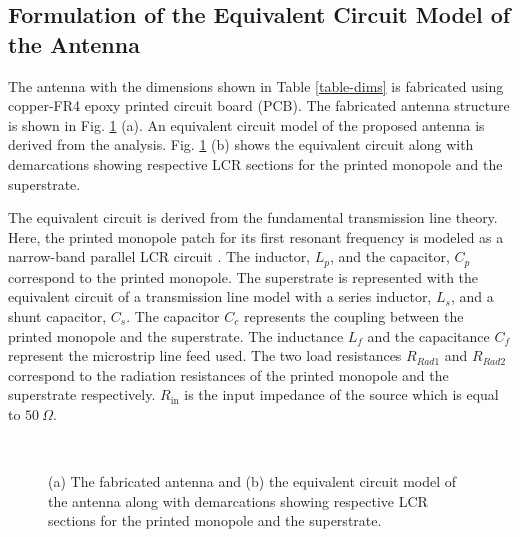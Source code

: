 \subsection{Formulation of the Equivalent Circuit Model of the Antenna}
The antenna with the dimensions shown in Table \ref{table-dims} is fabricated using copper-FR4 epoxy printed circuit board (PCB). The fabricated antenna structure is shown in Fig. \ref{FabEqckt} (a). An equivalent circuit model of the proposed antenna is derived from the analysis. Fig. \ref{FabEqckt} (b) shows the equivalent circuit along with demarcations showing respective LCR sections for the printed monopole and the superstrate.

The equivalent circuit is derived from the fundamental transmission line theory. Here, the printed monopole patch for its first resonant frequency is modeled as a narrow-band parallel LCR circuit \cite{UwbPmaEqCkt1}. The inductor, $L_p$, and the capacitor, $C_p$ correspond to the printed monopole. The superstrate is represented with the equivalent circuit of a transmission line model with a series inductor, $L_s$, and a shunt capacitor, $C_s$. The capacitor $C_c$ represents the coupling between the printed monopole and the superstrate. The inductance $L_{f}$ and the capacitance $C_{f}$ represent the microstrip line feed used. The two load resistances $R_{Rad1}$ and $R_{Rad2}$ correspond to the radiation resistances of the printed monopole and the superstrate respectively. $R_{\text{in}}$ is the input impedance of the source which is equal to $50~\Omega$.

\begin{figure}
\centering
{}~~~~
\caption{(a) The fabricated antenna and (b) the equivalent circuit model of the antenna along with demarcations showing respective LCR sections for the printed monopole and the superstrate.}\label{FabEqckt}
\end{figure}


